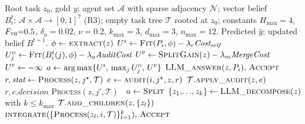 \begin{algorithm}[!ht]
\caption{EDO Stage-2 execution loop (single sample, recursive). The full EDO mechanism integrating R1 \texttt{split}, R2 recursive audit, and R3 vector-belief routing. The main paper reports the degenerate Stage-1 instance (TCPB), where \textsc{Split} is disabled and \textsc{Audit} defaults to \textsc{Accept}.}
\label{alg:edo-stage2-loop}
\small
\begin{algorithmic}[1]
\Require Root task $z_0$, gold $y$; agent set $\mathcal{A}$ with sparse adjacency $\mathcal{N}$; vector belief $B_i^{t}{:}\,\mathcal{A}{\times}\mathcal{A}{\to}[0,1]^{7}$ (R3); empty task tree $\mathcal{T}$ rooted at $z_0$; constants $H_{\max}{=}4$, $F_{\textsc{th}}{=}0.5$, $\delta_a{=}0.02$, $\nu{=}0.2$, $k_{\max}{=}3$, $d_{\max}{=}3$, $n_{\max}{=}12$.
\Ensure Predicted $\hat{y}$; updated belief $B^{t+1}$.
  \State $\phi \gets \textsc{extract}(z)$ 
  \State $U^{\textsc{s}} \gets \textsc{Fit}(P_i,\phi) - \lambda_c\textit{Cost}_{\textit{self}}$
    \State $U^{\textsc{o}}_j \gets \textsc{Fit}(B_i^{t}(j),\phi) - \lambda_a\textit{AuditCost}$
  \EndFor
  \State $U^{\textsc{p}} \gets \textsc{SplitGain}(z) - \lambda_m\textit{MergeCost}$ 
    \State $U^{\textsc{p}} \gets {-}\infty$ 
  \EndIf
  \State $a \gets \arg\max\{U^{\textsc{s}},\,\max_j U^{\textsc{o}}_j,\,U^{\textsc{p}}\}$
    \State \Return $\textsc{LLM\_answer}(z,P_i),\,\textsc{Accept}$
    \State $r,\textit{stat} \gets \textsc{Process}(z, j^{\star}, \mathcal{T})$
    \State $e \gets \textsc{audit}(i,j^{\star},z,r)$ 
    \State $\mathcal{T}.\textsc{apply\_audit}(z,e)$ 
     \Return $r, e.\textit{decision}$ \EndIf
      \State \Return \textsc{Process}$(z, j', \mathcal{T})$
    \Else \, $a \gets \textsc{Split}$ 
    \EndIf
  \EndIf
    \State $\{z_1,\!\dots\!,z_k\} \gets \textsc{LLM\_decompose}(z)$ with $k{\leq}k_{\max}$ 
    \State $\mathcal{T}.\textsc{add\_children}(z,\{z_l\})$
    \State \Return $\textsc{integrate}(\{\textsc{Process}(z_l,i,\mathcal{T})\}_{l=1}^k),\,\textsc{Accept}$

\end{algorithmic}
\end{algorithm}
